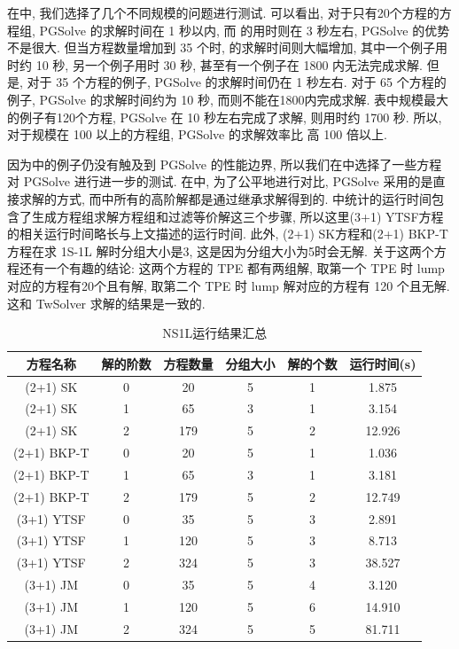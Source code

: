 在中, 我们选择了几个不同规模的问题进行测试. 可以看出, 对于只有20个方程的方程组, PGSolve 的求解时间在 1 秒以内, 而  的用时则在 3 秒左右, PGSolve 的优势不是很大. 但当方程数量增加到 35 个时,  的求解时间则大幅增加, 其中一个例子用时约 10 秒, 另一个例子用时 30 秒, 甚至有一个例子在 1800 内无法完成求解. 但是, 对于 35 个方程的例子, PGSolve 的求解时间仍在 1 秒左右. 对于 65 个方程的例子, PGSolve 的求解时间约为 10 秒, 而则不能在1800内完成求解. 表中规模最大的例子有120个方程, PGSolve 在 10 秒左右完成了求解, 则用时约 1700 秒. 所以, 对于规模在 100 以上的方程组, PGSolve 的求解效率比  高 100 倍以上.

因为中的例子仍没有触及到 PGSolve 的性能边界, 所以我们在中选择了一些方程对 PGSolve 进行进一步的测试. 在中, 为了公平地进行对比, PGSolve 采用的是直接求解的方式, 而中所有的高阶解都是通过继承求解得到的. 中统计的运行时间包含了生成方程组\D 求解方程组和过滤等价解这三个步骤, 所以这里(3+1) YTSF方程的相关运行时间略长与上文描述的运行时间. 此外, (2+1) SK方程和(2+1) BKP-T方程在求 1S-1L 解时分组大小是3, 这是因为分组大小为5时会无解. 关于这两个方程还有一个有趣的结论: 这两个方程的 TPE 都有两组解, 取第一个 TPE 时 lump 对应的方程有20个且有解, 取第二个 TPE 时 lump 解对应的方程有 120 个且无解. 这和 TwSolver 求解的结果是一致的. 

\begin{table}[htbp]
\centering
\caption{NS1L运行结果汇总} \label{NS1L-tb}
\begin{tabular}{cccccc}
\hline
方程名称    & 解的阶数 & 方程数量 & 分组大小 & 解的个数 & 运行时间(s) \\ 
\hline 
(2+1) SK & 0 & 20 & 5 & 1 & 1.875 \\
(2+1) SK & 1 & 65 & 3 & 1 & 3.154 \\
(2+1) SK & 2 & 179 & 5 & 2 & 12.926 \\
(2+1) BKP-T & 0 & 20 & 5 & 1 & 1.036 \\
(2+1) BKP-T & 1 & 65 & 3 & 1 & 3.181 \\
(2+1) BKP-T & 2 & 179 & 5 & 2 & 12.749 \\
(3+1) YTSF & 0 & 35 & 5 & 3 & 2.891 \\
(3+1) YTSF & 1 & 120 & 5 & 3 & 8.713 \\
(3+1) YTSF & 2 & 324 & 5 & 3 & 38.527 \\
(3+1) JM & 0 & 35 & 5 & 4 & 3.120 \\
(3+1) JM & 1 & 120 & 5 & 6 & 14.910 \\
(3+1) JM & 2 & 324 & 5 & 5 & 81.711 \\
\hline 
\end{tabular}
\end{table}

